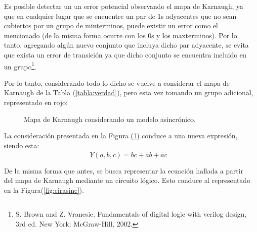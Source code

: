 Es posible detectar un un error potencial observando el mapa de Karnaugh, ya que en cualquier lugar que se encuentre un par de 1s adyacentes que no sean cubiertos por un grupo de minterminos, puede existir un error como el mencionado (de la misma forma ocurre con los 0s y los maxterminos). Por lo tanto, agregando algún nuevo conjunto que incluya dicho par adyacente, se evita que exista un error de transición ya que dicho conjunto se encuentra incluido en un grupo\footnote{S. Brown and Z. Vranesic, Fundamentals of digital logic with verilog design, 3rd ed. New York: McGraw-Hill, 2002.}.

Por lo tanto, considerando todo lo dicho se vuelve a considerar el mapa de Karnaugh de la Tabla (\ref{tabla:verdad}), pero esta vez tomando un grupo adicional, representado en rojo:
\begin{figure}[H]
\begin{centering}
    \begin{Karnaughvuit}
        
    \end{Karnaughvuit}
\par\end{centering}
\centering
\caption{Mapa de Karnaugh considerando un modelo asincrónico.}
\label{fig:karasinc}
\end{figure}

La consideración presentada en la Figura (\ref{fig:karasinc}) conduce a una nueva expresión, siendo esta:
\begin{equation}
	Y \left( a,b,c \right) = \bar{b} c + \bar{a} b + \bar{a} c
	\label{equ:karasinc}
\end{equation}

De la misma forma que antes, se busca representar la ecuación hallada a partir del mapa de Karnaugh mediante un circuito lógico. Esto conduce al representado en la Figura(\ref{fig:cirasinc}).

